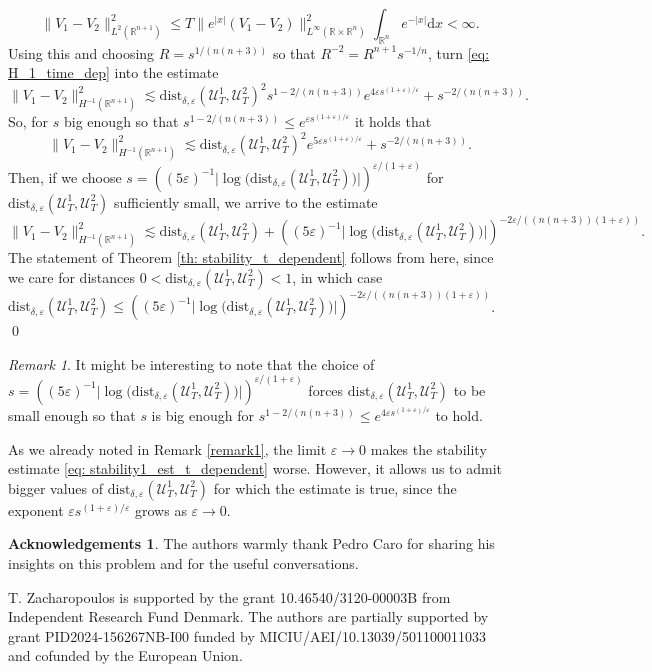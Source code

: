 \documentclass[10pt,a4paper]{amsart}
\theoremstyle{remark}
\newtheorem{remark}[proposition]{Remark}
\theoremstyle{definition}
\newtheorem*{acknowledgements}{Acknowledgements}
\newcommand{\R}{\mathbb{R}}
\newcommand{\dd}{\mathrm{d}}
\newcommand{\dist}{\mathrm{dist}}
\def\ve{\varepsilon}
\def\cal{\mathcal}
\begin{document}
%
\[
	\|V_1-V_2\|_{L^2(\R^{n+1})}^2\leq T \|e^{|x|}(V_1-V_2)\|_{L^\infty(\R\times\R^n)}^2 \int_{\R^n} e^{-|x|}\dd x <\infty.
\]
%
Using this and choosing $R=s^{1/(n(n+3))}$ so that $R^{-2}=R^{n+1}s^{-1/n}$, turn \eqref{eq: H_1_time_dep} into the estimate
%
\[
\|V_1-V_2\|^2_{H^{-1}(\R^{n+1})}\lesssim \dist_{\delta,\ve}(\cal{U}_T^1, \cal{U}_T^2)^2 s^{1-2/(n(n+3))}e^{4\ve s^{(1+\ve)/\ve}}+s^{-2/(n(n+3))}.
\]
%
So, for $s$ big enough so that $s^{1-2/(n(n+3))}\leq e^{\ve s^{(1+\ve)/\ve}}$ it holds that 
%
\[
\|V_1-V_2\|^2_{H^{-1}(\R^{n+1})}\lesssim \dist_{\delta,\ve}(\cal{U}_T^1, \cal{U}_T^2)^2 e^{5\ve s^{(1+\ve)/\ve}}+s^{-2/(n(n+3))}.
\]
%
Then, if we choose $s=\left((5\ve)^{-1}\big|\log \big( \dist_{\delta,\ve}(\cal{U}_T^1, \cal{U}_T^2) \big) \big|\right)^{\ve/(1+\ve)}$ for $\dist_{\delta,\ve}(\cal{U}_T^1, \cal{U}_T^2)$ sufficiently small, we arrive to the estimate
%
\[
\|V_1-V_2\|^2_{H^{-1}(\R^{n+1})}\lesssim \dist_{\delta,\ve}(\cal{U}_T^1, \cal{U}_T^2)
+\left((5\ve)^{-1}\big|\log \big(\dist_{\delta,\ve}(\cal{U}_T^1, \cal{U}_T^2)\big)\big|\right)^{-2\ve/((n(n+3))(1+\ve))}.
\]
%
The statement of Theorem \ref{th: stability_t_dependent} follows from here, since we care for distances  
$0<\dist_{\delta,\ve}(\cal{U}_T^1, \cal{U}_T^2)<1$, in which case 
$\dist_{\delta,\ve}(\cal{U}_T^1, \cal{U}_T^2) \leq 
\left((5\ve)^{-1}\big|\log \big(\dist_{\delta,\ve}(\cal{U}_T^1, \cal{U}_T^2)\big)\big|\right)^{-2\ve/((n(n+3))(1+\ve))}$.
\qed

\begin{remark}
	It might be interesting to note that the choice of $s=\left((5\ve)^{-1}\big|\log\big(\dist_{\delta,\ve}(\cal{U}_T^1, \cal{U}_T^2)\big) \big|\right)^{\ve/(1+\ve)}$ forces $\dist_{\delta,\ve}(\cal{U}_T^1, \cal{U}_T^2)$ to be small enough so that $s$ is big enough for $s^{1-2/(n(n+3))}\leq e^{4\ve s^{(1+\ve)/\ve}}$ to hold.

	As we already noted in Remark \ref{remark1}, the limit $\ve\to 0$ makes the stability estimate \eqref{eq: stability1_est_t_dependent} worse. However, it allows us to admit bigger values of $\dist_{\delta,\ve}(\cal{U}_T^1, \cal{U}_T^2)$ for which the estimate is true, since the exponent $\ve s^{(1+\ve)/\ve}$ grows as $\ve\to 0$.
\end{remark}









\sloppy
\begin{acknowledgements}
%
The authors warmly thank Pedro Caro for sharing his insights on this problem and for the useful conversations. 

\vspace{0.2cm}

\noindent  T. Zacharopoulos is supported by the grant 10.46540/3120-00003B from Independent Research Fund Denmark. 
The authors are partially supported by grant PID2024-156267NB-I00 funded by MICIU/AEI/10.13039/501100011033 and cofunded by the European Union.
\end{acknowledgements}


{}

\end{document}
